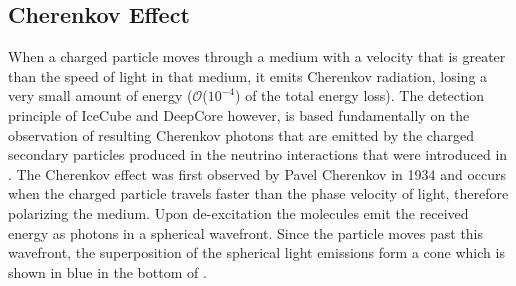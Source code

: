 \subsection{Cherenkov Effect} 

When a charged particle moves through a medium with a velocity that is greater than the speed of light in that medium, it emits Cherenkov radiation, losing a very small amount of energy ($\mathcal{O}$($10^{-4}$) of the total energy loss). The detection principle of IceCube and DeepCore however, is based fundamentally on the observation of resulting Cherenkov photons that are emitted by the charged secondary particles produced in the neutrino interactions that were introduced in . The Cherenkov effect was first observed by Pavel Cherenkov in 1934  and occurs when the charged particle travels faster than the phase velocity of light, therefore polarizing the medium. Upon de-excitation the molecules emit the received energy as photons in a spherical wavefront. Since the particle moves past this wavefront, the superposition of the spherical light emissions form a cone which is shown in blue in the bottom of .

